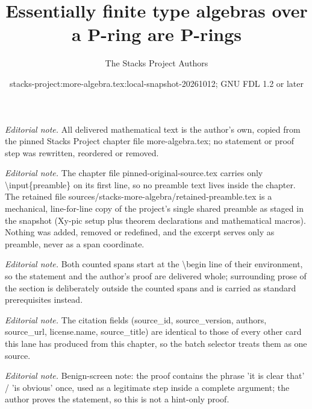 \documentclass[10pt,a4paper]{amsart}
\title{Essentially finite type algebras over a P-ring are P-rings}
\author{The Stacks Project Authors}
\date{stacks-project:more-algebra.tex:local-snapshot-20261012; GNU FDL 1.2 or later}
\theoremstyle{plain}
\theoremstyle{definition}
\theoremstyle{remark}
\numberwithin{equation}{subsection}
\begin{document}
\maketitle
\setcounter{subsection}{1}
\noindent\textit{Editorial note.} All delivered mathematical text is the author's own, copied from the pinned Stacks Project chapter file more-algebra.tex; no statement or proof step was rewritten, reordered or removed.\par\medskip
\noindent\textit{Editorial note.} The chapter file pinned-original-source.tex carries only \textbackslash{}input\{preamble\} on its first line, so no preamble text lives inside the chapter. The retained file sources/stacks-more-algebra/retained-preamble.tex is a mechanical, line-for-line copy of the project's single shared preamble as staged in the snapshot (Xy-pic setup plus theorem declarations and mathematical macros). Nothing was added, removed or redefined, and the excerpt serves only as preamble, never as a span coordinate.\par\medskip
\noindent\textit{Editorial note.} Both counted spans start at the \textbackslash{}begin line of their environment, so the statement and the author's proof are delivered whole; surrounding prose of the section is deliberately outside the counted spans and is carried as standard prerequisites instead.\par\medskip
\noindent\textit{Editorial note.} The citation fields (source\_id, source\_version, authors, source\_url, license.name, source\_title) are identical to those of every other card this lane has produced from this chapter, so the batch selector treats them as one source.\par\medskip
\noindent\textit{Editorial note.} Benign-screen note: the proof contains the phrase 'it is clear that' / 'is obvious' once, used as a legitimate step inside a complete argument; the author proves the statement, so this is not a hint-only proof.\par\medskip
\end{document}
